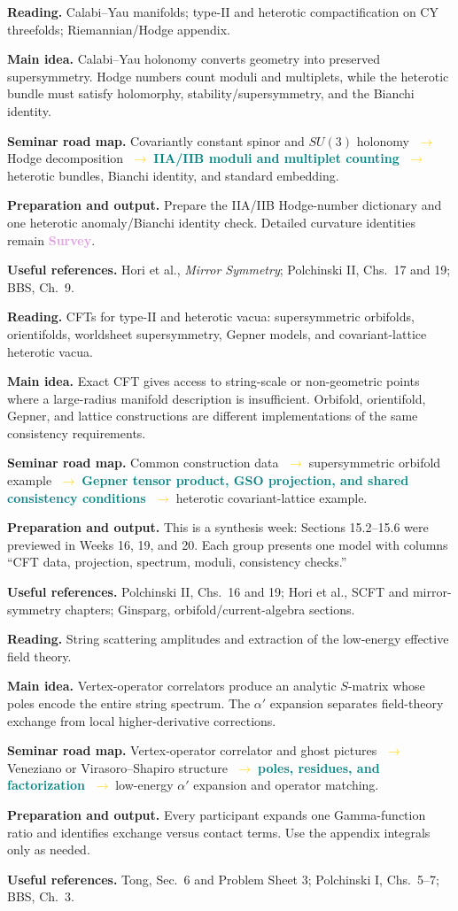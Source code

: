 \documentclass[11pt]{article}
\newcommand{\survey}{\textcolor{plum}{\textbf{Survey}}}
\newcommand{\essential}[1]{\textcolor{teal}{\textbf{#1}}}
\newcommand{\roadarrow}{\textcolor{gold}{\ensuremath{\;\longrightarrow\;}}}
\newcommand{\seminarweek}[7]{%
  \begin{tcolorbox}[
    enhanced,
    colback=white,colframe=navy,
    boxrule=0.65pt,arc=1.5mm,
    left=3mm,right=3mm,top=2mm,bottom=2mm,
    title={#1\hfill\normalfont #2},
    fonttitle=\bfseries,coltitle=white,colbacktitle=navy
  ]
  \textbf{Reading.} #3

  \textbf{Main idea.} #4

  \textbf{Seminar road map.} #5

  \textbf{Preparation and output.} #6

  \textbf{Useful references.} #7
  \end{tcolorbox}
}
\begin{document}
\seminarweek{Week 22}{Ch.~14.5--14.8, pp.~473--520}
{Calabi--Yau manifolds; type-II and heterotic compactification on CY threefolds;
Riemannian/Hodge appendix.}
{Calabi--Yau holonomy converts geometry into preserved supersymmetry.  Hodge
numbers count moduli and multiplets, while the heterotic bundle must satisfy
holomorphy, stability/supersymmetry, and the Bianchi identity.}
{Covariantly constant spinor and $SU(3)$ holonomy \roadarrow Hodge decomposition
\roadarrow \essential{IIA/IIB moduli and multiplet counting} \roadarrow
heterotic bundles, Bianchi identity, and standard embedding.}
{Prepare the IIA/IIB Hodge-number dictionary and one heterotic anomaly/Bianchi
identity check.  Detailed curvature identities remain \survey{}.}
{Hori et al., \emph{Mirror Symmetry}; Polchinski II, Chs.~17 and 19; BBS,
Ch.~9.}

\seminarweek{Week 23}{Ch.~15, pp.~521--584, integrated review}
{CFTs for type-II and heterotic vacua: supersymmetric orbifolds, orientifolds,
worldsheet supersymmetry, Gepner models, and covariant-lattice heterotic vacua.}
{Exact CFT gives access to string-scale or non-geometric points where a
large-radius manifold description is insufficient.  Orbifold, orientifold,
Gepner, and lattice constructions are different implementations of the same
consistency requirements.}
{Common construction data \roadarrow supersymmetric orbifold example
\roadarrow \essential{Gepner tensor product, GSO projection, and shared
consistency conditions} \roadarrow heterotic covariant-lattice example.}
{This is a synthesis week: Sections 15.2--15.6 were previewed in Weeks 16,
19, and 20.  Each group presents one model with columns ``CFT data, projection,
spectrum, moduli, consistency checks.''}
{Polchinski II, Chs.~16 and 19; Hori et al., SCFT and mirror-symmetry chapters;
Ginsparg, orbifold/current-algebra sections.}

\seminarweek{Week 24}{Ch.~16.1--16.3, pp.~585--621}
{String scattering amplitudes and extraction of the low-energy effective field
theory.}
{Vertex-operator correlators produce an analytic $S$-matrix whose poles encode
the entire string spectrum.  The $\alpha'$ expansion separates field-theory
exchange from local higher-derivative corrections.}
{Vertex-operator correlator and ghost pictures \roadarrow Veneziano or
Virasoro--Shapiro structure \roadarrow \essential{poles, residues, and
factorization} \roadarrow low-energy $\alpha'$ expansion and operator matching.}
{Every participant expands one Gamma-function ratio and identifies exchange
versus contact terms.  Use the appendix integrals only as needed.}
{Tong, Sec.~6 and Problem Sheet 3; Polchinski I, Chs.~5--7; BBS, Ch.~3.}
\end{document}
